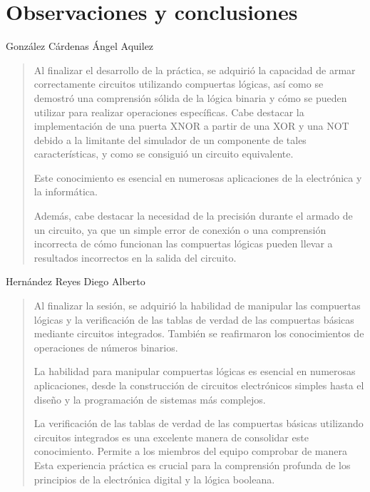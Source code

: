 \documentclass[a4paper,12pt]{article}
\begin{document}
\newpage

\section{Observaciones y conclusiones}

González Cárdenas Ángel Aquilez

\begin{quotation}
	Al finalizar el desarrollo de la práctica, se adquirió la capacidad de armar correctamente circuitos utilizando compuertas lógicas, así como se demostró una comprensión sólida de la lógica binaria y cómo se pueden utilizar para realizar operaciones específicas.
	Cabe destacar la implementación de una puerta XNOR a partir de una XOR y una NOT debido a la limitante del simulador de un componente de tales características, y como se consiguió un circuito equivalente.\par

	Este conocimiento es esencial en numerosas aplicaciones de la electrónica y la informática.\par

	Además, cabe destacar la necesidad de la precisión durante el armado de un circuito, ya que un simple error de conexión o una comprensión incorrecta de cómo funcionan las compuertas lógicas pueden llevar a resultados incorrectos en la salida del circuito.\par
\end{quotation}

\vspace{1cm}

Hernández Reyes Diego Alberto

\begin{quotation}
	Al finalizar la sesión, se adquirió la habilidad de manipular las compuertas lógicas y la verificación de las tablas de verdad de las compuertas básicas mediante circuitos integrados. También se reafirmaron los conocimientos de operaciones de números binarios.\par

	La habilidad para manipular compuertas lógicas es esencial en numerosas aplicaciones, desde la construcción de circuitos electrónicos simples hasta el diseño y la programación de sistemas más complejos.\par

	La verificación de las tablas de verdad de las compuertas básicas utilizando circuitos integrados es una excelente manera de consolidar este conocimiento. Permite a los miembros del equipo comprobar de manera Esta experiencia práctica es crucial para la comprensión profunda de los principios de la electrónica digital y la lógica booleana. \par
\end{quotation}
\end{document}
